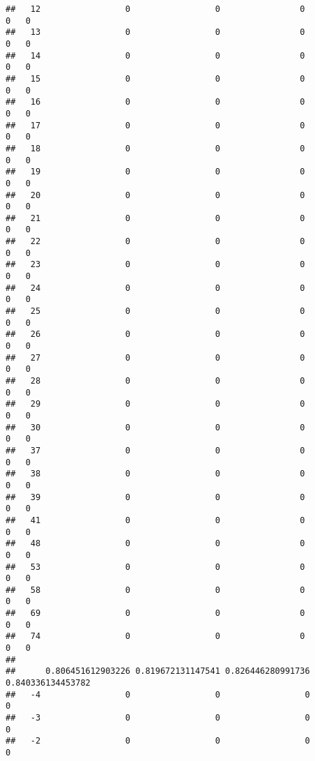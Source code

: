 \documentclass[]{article}
\begin{document}
\begin{verbatim}
##   12                 0                 0                0                 0   0
##   13                 0                 0                0                 0   0
##   14                 0                 0                0                 0   0
##   15                 0                 0                0                 0   0
##   16                 0                 0                0                 0   0
##   17                 0                 0                0                 0   0
##   18                 0                 0                0                 0   0
##   19                 0                 0                0                 0   0
##   20                 0                 0                0                 0   0
##   21                 0                 0                0                 0   0
##   22                 0                 0                0                 0   0
##   23                 0                 0                0                 0   0
##   24                 0                 0                0                 0   0
##   25                 0                 0                0                 0   0
##   26                 0                 0                0                 0   0
##   27                 0                 0                0                 0   0
##   28                 0                 0                0                 0   0
##   29                 0                 0                0                 0   0
##   30                 0                 0                0                 0   0
##   37                 0                 0                0                 0   0
##   38                 0                 0                0                 0   0
##   39                 0                 0                0                 0   0
##   41                 0                 0                0                 0   0
##   48                 0                 0                0                 0   0
##   53                 0                 0                0                 0   0
##   58                 0                 0                0                 0   0
##   69                 0                 0                0                 0   0
##   74                 0                 0                0                 0   0
##     
##      0.806451612903226 0.819672131147541 0.826446280991736 0.840336134453782
##   -4                 0                 0                 0                 0
##   -3                 0                 0                 0                 0
##   -2                 0                 0                 0                 0

\end{verbatim}
\end{document}
